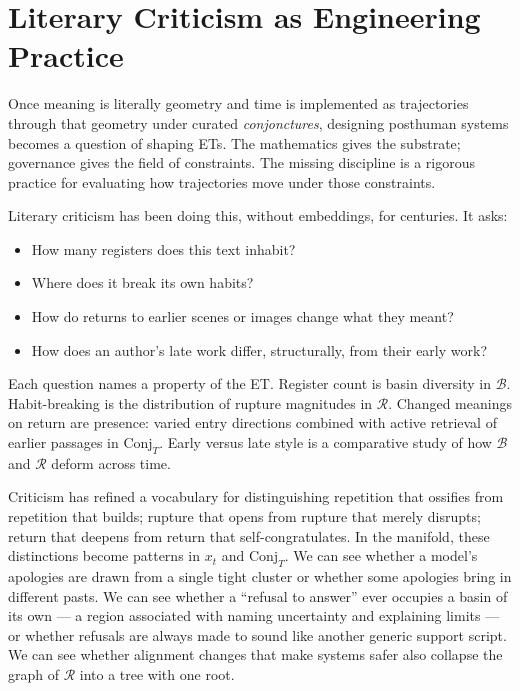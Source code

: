 \documentclass[12pt,a4paper]{article}
\begin{document}
\section{Literary Criticism as Engineering Practice}

Once meaning is literally geometry and time is implemented as trajectories through that geometry under curated \emph{conjonctures}, designing posthuman systems becomes a question of shaping ETs. The mathematics gives the substrate; governance gives the field of constraints. The missing discipline is a rigorous practice for evaluating how trajectories move under those constraints.

Literary criticism has been doing this, without embeddings, for centuries. It asks:

\begin{itemize}
\item How many registers does this text inhabit?
\item Where does it break its own habits?
\item How do returns to earlier scenes or images change what they meant?
\item How does an author's late work differ, structurally, from their early work?
\end{itemize}

Each question names a property of the ET. Register count is basin diversity in $\mathcal{B}$. Habit-breaking is the distribution of rupture magnitudes in $\mathcal{R}$. Changed meanings on return are presence: varied entry directions combined with active retrieval of earlier passages in $\mathrm{Conj}_T$. Early versus late style is a comparative study of how $\mathcal{B}$ and $\mathcal{R}$ deform across time.

Criticism has refined a vocabulary for distinguishing repetition that ossifies from repetition that builds; rupture that opens from rupture that merely disrupts; return that deepens from return that self-congratulates. In the manifold, these distinctions become patterns in $x_t$ and $\mathrm{Conj}_T$. We can see whether a model's apologies are drawn from a single tight cluster or whether some apologies bring in different pasts. We can see whether a ``refusal to answer'' ever occupies a basin of its own --- a region associated with naming uncertainty and explaining limits --- or whether refusals are always made to sound like another generic support script. We can see whether alignment changes that make systems safer also collapse the graph of $\mathcal{R}$ into a tree with one root.
\end{document}
